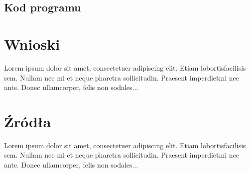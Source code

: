\documentclass{article}
\begin{document}
  \subsection{Kod programu}
    
  \section{Wnioski}
  Lorem  ipsum  dolor  sit  amet,  consectetuer  adipiscing  
  elit.   Etiam  lobortisfacilisis sem.  Nullam nec mi et 
  neque pharetra sollicitudin.  Praesent imperdietmi nec ante. 
  Donec ullamcorper, felis non sodales...
  
  \section{Źródła}
  Lorem  ipsum  dolor  sit  amet,  consectetuer  adipiscing  
  elit.   Etiam  lobortisfacilisis sem.  Nullam nec mi et 
  neque pharetra sollicitudin.  Praesent imperdietmi nec ante. 
  Donec ullamcorper, felis non sodales...
\end{document}
